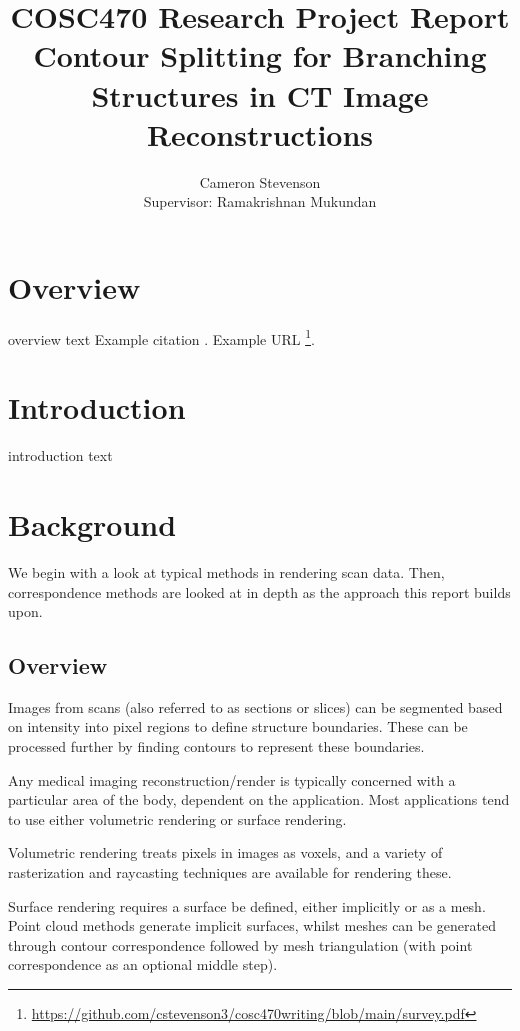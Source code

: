 \documentclass[11p, titlepage]{article}
\title{COSC470 Research Project Report\\
\bigskip
Contour Splitting for Branching Structures in CT Image Reconstructions}
\author{Cameron Stevenson\\[0.5cm]{\small Supervisor: Ramakrishnan Mukundan}}
\begin{document}
\maketitle
{}
\tableofcontents

\section{Overview}

overview text
Example citation \cite{mackay2019robust, mukundan2016reconstruction, pan2017comparison}.
Example URL \footnote{\url{https://github.com/cstevenson3/cosc470writing/blob/main/survey.pdf}}.

\section{Introduction}

introduction text

\section{Background}

We begin with a look at typical methods in rendering scan data. Then, correspondence methods are looked at in depth as the approach this report builds upon.

\subsection{Overview}

Images from scans (also referred to as sections or slices) can be segmented based on intensity into pixel regions to define structure boundaries. These can be processed further by finding contours to represent these boundaries.

Any medical imaging reconstruction/render is typically concerned with a particular area of the body, dependent on the application. Most applications tend to use either volumetric rendering or surface rendering.

Volumetric rendering treats pixels in images as voxels, and a variety of rasterization and raycasting techniques are available for rendering these.

Surface rendering requires a surface be defined, either implicitly or as a mesh. Point cloud methods generate implicit surfaces, whilst meshes can be generated through contour correspondence followed by mesh triangulation (with point correspondence as an optional middle step). 
\end{document}
